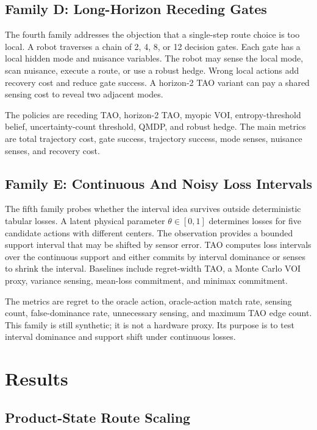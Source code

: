 \documentclass{article}
\begin{document}
\subsection{Family D: Long-Horizon Receding Gates}

The fourth family addresses the objection that a single-step route choice is too local. A robot traverses a chain of 2, 4, 8, or 12 decision gates. Each gate has a local hidden mode and nuisance variables. The robot may sense the local mode, scan nuisance, execute a route, or use a robust hedge. Wrong local actions add recovery cost and reduce gate success. A horizon-2 TAO variant can pay a shared sensing cost to reveal two adjacent modes.

The policies are receding TAO, horizon-2 TAO, myopic VOI, entropy-threshold belief, uncertainty-count threshold, QMDP, and robust hedge. The main metrics are total trajectory cost, gate success, trajectory success, mode senses, nuisance senses, and recovery cost.

\subsection{Family E: Continuous And Noisy Loss Intervals}

The fifth family probes whether the interval idea survives outside deterministic tabular losses. A latent physical parameter $\theta\in[0,1]$ determines losses for five candidate actions with different centers. The observation provides a bounded support interval that may be shifted by sensor error. TAO computes loss intervals over the continuous support and either commits by interval dominance or senses to shrink the interval. Baselines include regret-width TAO, a Monte Carlo VOI proxy, variance sensing, mean-loss commitment, and minimax commitment.

The metrics are regret to the oracle action, oracle-action match rate, sensing count, false-dominance rate, unnecessary sensing, and maximum TAO edge count. This family is still synthetic; it is not a hardware proxy. Its purpose is to test interval dominance and support shift under continuous losses.

\section{Results}

\subsection{Product-State Route Scaling}
\end{document}
